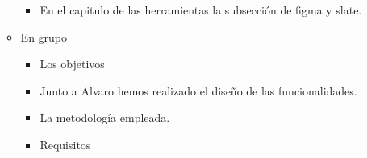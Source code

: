 \begin{itemize}
\begin{itemize}
\begin{itemize}
                \item En el capitulo de las herramientas la subsección de figma y slate.
            \end{itemize}
        \item En grupo
            \begin{itemize}
                \item Los objetivos
                \item Junto a Alvaro hemos realizado el diseño de las funcionalidades.
                \item La metodología empleada.
                \item Requisitos
            \end{itemize}
    \end{itemize}
\end{itemize}